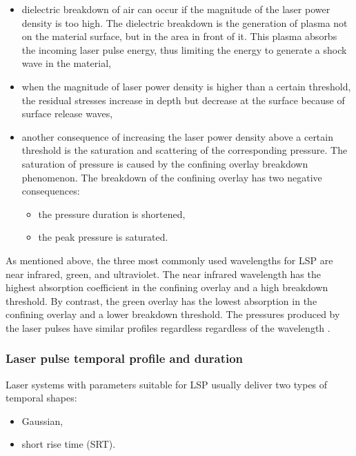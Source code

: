 \begin{itemize}

    \item dielectric breakdown of air can occur if the magnitude of the laser power density is too high. The dielectric breakdown is the generation of plasma not on the material surface, but in the area in front of it. This plasma absorbs the incoming laser pulse energy, thus limiting the energy to generate a shock wave in the material,

    \item when the magnitude of laser power density is higher than a certain threshold, the residual stresses increase in depth but decrease at the surface because of surface release waves,

    \item another consequence of increasing the laser power density above a certain threshold is the saturation and scattering of the corresponding pressure. The saturation of pressure is caused by the confining overlay breakdown phenomenon. The breakdown of the confining overlay has two negative consequences: 
    
    \begin{itemize}
        \item the pressure duration is shortened,
        \item the peak pressure is saturated.
    \end{itemize}
  
  
\end{itemize}    
As mentioned above, the three most commonly used wavelengths for LSP are near infrared, green, and ultraviolet. The near infrared wavelength has the highest absorption coefficient in the confining overlay and a high breakdown threshold. By contrast, the green overlay has the lowest absorption in the confining overlay and a lower breakdown threshold. The pressures produced by the laser pulses have similar profiles regardless regardless of the wavelength \cite{berthe_fabbro_peyre_bartnicki_1999}.



\subsubsection*{Laser pulse temporal profile and duration}

Laser systems with parameters suitable for LSP usually deliver two types of temporal shapes:

\begin{itemize}

    \item Gaussian,
    \item short rise time (SRT).
    
\end{itemize}

